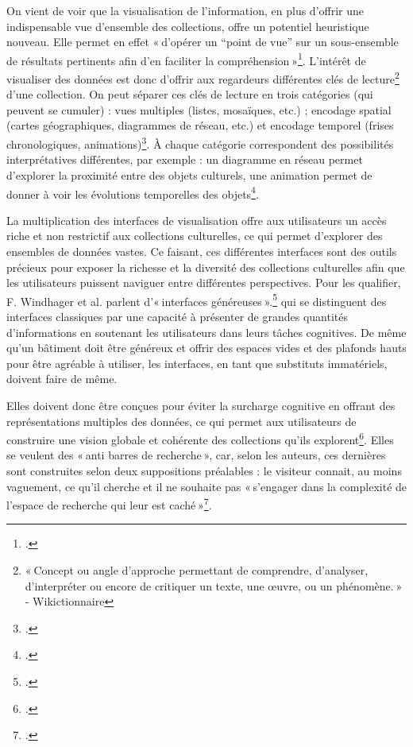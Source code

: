 On vient de voir que la visualisation de l’information, en plus d’offrir une indispensable vue d’ensemble des collections, offre un potentiel heuristique nouveau. Elle permet en effet « d’opérer un “point de vue” sur un sous-ensemble de résultats pertinents afin d’en faciliter la compréhension »\footcite[§ 3]{hachour_fouille_2015}. L’intérêt de visualiser des données est donc d’offrir aux regardeurs différentes clés de lecture\footnote{ « Concept ou angle d’approche permettant de comprendre, d’analyser, d’interpréter ou encore de critiquer un texte, une œuvre, ou un phénomène. » - Wikictionnaire } d’une collection. On peut séparer ces clés de lecture en trois catégories (qui peuvent se cumuler) : vues multiples (listes, mosaïques, etc.) ; encodage spatial (cartes géographiques, diagrammes de réseau, etc.) et encodage temporel (frises chronologiques, animations)\footcite[p. 76]{windhager_review_nodate}. À chaque catégorie correspondent des possibilités interprétatives différentes, par exemple : un diagramme en réseau permet d’explorer la proximité entre des objets culturels, une animation permet de donner à voir les évolutions temporelles des objets\footcite[p. 77]{windhager_review_nodate}.

La multiplication des interfaces de visualisation offre aux utilisateurs un accès riche et non restrictif aux collections culturelles, ce qui permet d’explorer des ensembles de données vastes. Ce faisant, ces différentes interfaces sont des outils précieux pour exposer la richesse et la diversité des collections culturelles afin que les utilisateurs puissent naviguer entre différentes perspectives. Pour les qualifier, F. Windhager et al. parlent d’« interfaces généreuses ».\footcite[p. 5]{windhager_orchestrating_2018} qui se distinguent des interfaces classiques par une capacité à présenter de grandes quantités d’informations en soutenant les utilisateurs dans leurs tâches cognitives. De même qu’un bâtiment doit être généreux et offrir des espaces vides et des plafonds hauts pour être agréable à utiliser, les interfaces, en tant que substituts immatériels, doivent faire de même.

Elles doivent donc être conçues pour éviter la surcharge cognitive en offrant des représentations multiples des données, ce qui permet aux utilisateurs de construire une vision globale et cohérente des collections qu’ils explorent\footcite[pp. 5-6]{windhager_orchestrating_2018}. Elles se veulent des « anti barres de recherche », car, selon les auteurs, ces dernières sont construites selon deux suppositions préalables : le visiteur connait, au moins vaguement, ce qu’il cherche et il ne souhaite pas « s’engager dans la complexité de l’espace de recherche qui leur est caché »\footcite[p. 6]{windhager_orchestrating_2018}.

